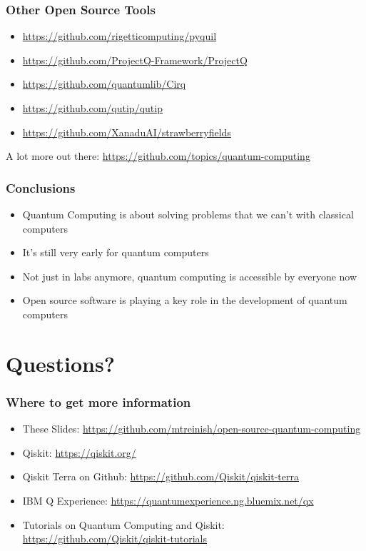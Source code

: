 \documentclass[aspectratio=169,11pt,hyperref={colorlinks=true}]{beamer}
\begin{document}
\begin{frame}
    \frametitle{Other Open Source Tools}
    \begin{itemize}
        \item \href{https://github.com/rigetticomputing/pyquil}{https://github.com/rigetticomputing/pyquil}
        \item \href{https://github.com/ProjectQ-Framework/ProjectQ}{https://github.com/ProjectQ-Framework/ProjectQ}
        \item \href{https://github.com/quantumlib/Cirq}{https://github.com/quantumlib/Cirq}
        \item \href{https://github.com/qutip/qutip}{https://github.com/qutip/qutip}
        \item \href{https://github.com/XanaduAI/strawberryfields}{https://github.com/XanaduAI/strawberryfields}
    \end{itemize}
    A lot more out there:
    \href{https://github.com/topics/quantum-computing}{https://github.com/topics/quantum-computing}
\end{frame}

\begin{frame}
    \frametitle{Conclusions}
    \begin{itemize}
        \item Quantum Computing is about solving problems that we can't with
            classical computers
        \item It's still very early for quantum computers
        \item Not just in labs anymore, quantum computing is accessible by
            everyone now
        \item Open source software is playing a key role in the development of quantum computers
    \end{itemize}
\end{frame}

\section{Questions?}
\begin{frame}
\frametitle{Where to get more information}
    \begin{itemize}
        \item These Slides: \href{https://github.com/mtreinish/open-source-quantum-computing}{https://github.com/mtreinish/open-source-quantum-computing}
        \item Qiskit: \href{https://qiskit.org/}{https://qiskit.org/}
        \item Qiskit Terra on Github: \href{https://github.com/Qiskit/qiskit-terra}{https://github.com/Qiskit/qiskit-terra}
        \item IBM Q Experience: \href{https://quantumexperience.ng.bluemix.net/qx}{https://quantumexperience.ng.bluemix.net/qx}
        \item Tutorials on Quantum Computing and Qiskit: \href{https://github.com/Qiskit/qiskit-tutorials}{https://github.com/Qiskit/qiskit-tutorials}
    \end{itemize}
\end{frame}
\end{document}
